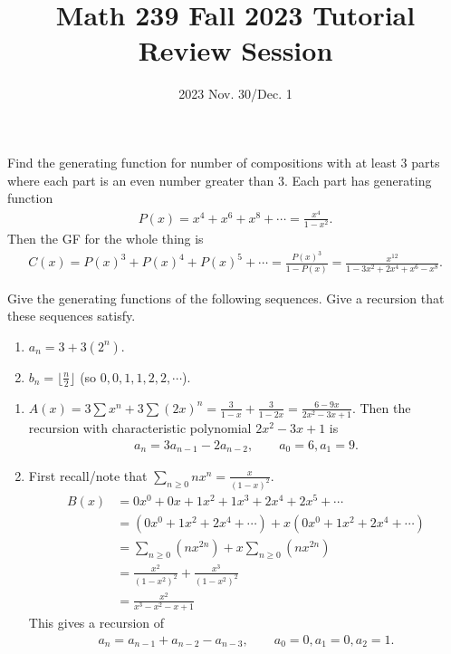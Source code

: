 \title{Math 239 Fall 2023 Tutorial Review Session}

\date{2023 Nov. 30/Dec. 1}
\maketitle

\begin{enumerate}
     Find the generating function for number of compositions with at least $3$ parts where each part is an even number greater than $3$.
    \answer Each part has generating function
    \begin{align*}
        P(x) = x^4 + x^6 + x^8 + \cdots = \frac{x^4}{1-x^2}.
    \end{align*}
    Then the GF for the whole thing is
    \begin{align*}
        C(x) = P(x)^3 + P(x)^4 + P(x)^5 + \cdots = \frac{P(x)^3}{1-P(x)} = \frac{x^{12}}{1-3x^2 +2x^4 +x^6 -x^8}.
    \end{align*}
    
     Give the generating functions of the following sequences. Give a recursion that these sequences satisfy.
    \begin{enumerate}
        \item $a_n = 3 + 3(2^n)$.
        \item $b_n = \lfloor \frac{n}{2} \rfloor$ (so $0,0,1,1,2,2, \cdots$).
    \end{enumerate}
    \answer 
    \begin{enumerate}
        \item $A(x) = 3 \sum x^n + 3 \sum(2x)^n = \frac{3}{1-x} + \frac{3}{1-2x} = \frac{6 - 9 x}{2 x^2 - 3 x + 1}$.
        Then the recursion with characteristic polynomial $2 x^2 - 3 x + 1$ is
        \begin{align*}
            a_n = 3a_{n-1} - 2a_{n-2}, \qquad a_{0} = 6 , a_{1} = 9.
        \end{align*}
        \item First recall/note that $\sum_{n \geq 0} n x^n = \frac{x}{(1-x)^2}$.
        \begin{align*}
            B(x) &= 0x^0 + 0x + 1x^2 + 1x^3 + 2x^4 + 2x^5 + \cdots\\
            &= \left( 0x^0 + 1x^2 + 2x^4 + \cdots \right) + x\left( 0x^0 + 1x^2 + 2x^4 + \cdots\right)\\
            &= \sum_{n \geq 0} \left(  n x^{2n} \right) + x \sum_{n \geq 0} \left(  n x^{2n} \right)\\
            &= \frac{x^2}{(1-x^2)^2} + \frac{x^3}{(1-x^2)^2}\\
            &= \frac{x^2}{x^3 - x^2 - x + 1}
        \end{align*}
        This gives a recursion of
        \begin{align*}
            a_n = a_{n-1} + a_{n-2} - a_{n-3}, \qquad a_0 = 0, a_1 = 0, a_2 = 1.
        \end{align*}
    \end{enumerate}
    

\end{enumerate}
